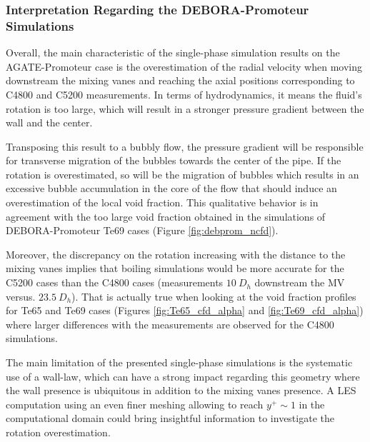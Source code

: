 \clearpage



\subsubsection{Interpretation Regarding the DEBORA-Promoteur Simulations}

Overall, the main characteristic of the single-phase simulation results on the AGATE-Promoteur case is the overestimation of the radial velocity when moving downstream the mixing vanes and reaching the axial positions corresponding to C4800 and C5200 measurements. In terms of hydrodynamics, it means the fluid's rotation is too large, which will result in a stronger pressure gradient between the wall and the center. 

\npar

Transposing this result to a bubbly flow, the pressure gradient will be responsible for transverse migration of the bubbles towards the center of the pipe. If the rotation is overestimated, so will be the migration of bubbles which results in an excessive bubble accumulation in the core of the flow that should induce an overestimation of the local void fraction. This qualitative behavior is in agreement with the too large void fraction obtained in the simulations of DEBORA-Promoteur Te69 cases (Figure \ref{fig:debprom_ncfd}).

\npar

Moreover, the discrepancy on the rotation increasing with the distance to the mixing vanes implies that boiling simulations would be more accurate for the C5200 cases than the C4800 cases (measurements $10\ D_{h}$ downstream the MV versus. $23.5\ D_{h}$). That is actually true when looking at the void fraction profiles for Te65 and Te69 cases (Figures \ref{fig:Te65_cfd_alpha} and \ref{fig:Te69_cfd_alpha}) where larger differences with the measurements are observed for the C4800 simulations.



\begin{remark*}{}
The main limitation of the presented single-phase simulations is the systematic use of a wall-law, which can have a strong impact regarding this geometry where the wall presence is ubiquitous in addition to the mixing vanes presence. A LES computation using an even finer meshing allowing to reach $y^{+} \sim 1$ in the computational domain could bring insightful information to investigate the rotation overestimation.
\end{remark*}

